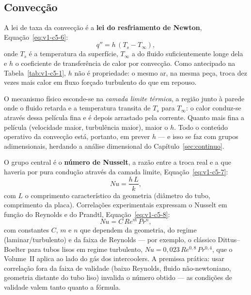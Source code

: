 \documentclass[12pt,a4paper]{article}
\numberwithin{equation}{section}
\numberwithin{table}{section}
\numberwithin{figure}{section}
\begin{document}
\subsection{Convecção}\label{sub:v1-c5-conveccao}

A lei de taxa da convecção é a \textbf{lei do resfriamento de Newton},
Equação~\eqref{eq:v1-c5-6}:
\begin{equation}\label{eq:v1-c5-6}
q'' = h\,(T_s - T_\infty),
\end{equation}
onde $T_s$ é a temperatura da superfície, $T_\infty$ a do fluido
suficientemente longe dela e $h$ o coeficiente de transferência de calor por
convecção. Como antecipado na Tabela~\ref{tab:v1-c5-1}, $h$ não é
propriedade: o mesmo ar, na mesma peça, troca dez vezes mais calor em fluxo
forçado turbulento do que em repouso.

O mecanismo físico esconde-se na \emph{camada limite térmica}, a região junto
à parede onde o fluido retarda e a temperatura transita de $T_s$ para
$T_\infty$: o calor conduz-se através dessa película fina e é depois
arrastado pela corrente. Quanto mais fina a película (velocidade maior,
turbulência maior), maior o $h$. Todo o conteúdo operativo da convecção
está, portanto, em prever $h$ --- e isso se faz com grupos adimensionais,
herdando a análise dimensional do Capítulo~\ref{sec:continuo}.

O grupo central é o \textbf{número de Nusselt}, a razão entre a troca real e
a que haveria por pura condução através da camada limite,
Equação~\eqref{eq:v1-c5-7}:
\begin{equation}\label{eq:v1-c5-7}
Nu = \frac{h\,L}{k},
\end{equation}
com $L$ o comprimento característico da geometria (diâmetro do tubo,
comprimento da placa). Correlações experimentais expressam o Nusselt em
função do Reynolds e do Prandtl, Equação~\eqref{eq:v1-c5-8}:
\begin{equation}\label{eq:v1-c5-8}
Nu = C \, Re^m \, Pr^n,
\end{equation}
com constantes $C$, $m$ e $n$ que dependem da geometria, do regime
(laminar/turbulento) e da faixa de Reynolds --- por exemplo, o clássico
Dittus--Boelter para tubos lisos em regime turbulento, $Nu = 0{,}023\,
Re^{0{,}8}\,Pr^{0{,}4}$, que o Volume~II aplica ao lado do gás dos
intercoolers. A premissa prática: usar correlação fora da faixa de validade
(baixo Reynolds, fluido não-newtoniano, geometria distante do tubo liso)
invalida o número obtido --- as condições de validade valem tanto quanto a
fórmula.
\end{document}
